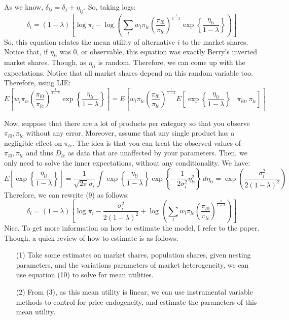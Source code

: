 \documentclass[12pt]{article}
\begin{document}
As we know, $\delta_{lj} = \delta_{j}+ \eta_{lj}$. So, taking logs:
\begin{equation}
\boxed{
    \delta_{i} = (1-\lambda) \left[\log \pi_i - \log \left(\sum_{l} w_l \pi_{lc} \left(\frac{\pi_{l0}}{\pi_{lc}}\right)^{\frac{1}{1-\lambda}} \exp\left\{\frac{\eta_{li}}{1-\lambda}\right\}\right)\right]}
\end{equation}
So, this equation relates the mean utility of alternative $i$ to the market shares. Notice that, if $\eta_{li}$ was 0, or observable, this equation was exactly Berry's inverted market shares. Though, as $\eta_{li}$ is random. Therefore, we can come up with the expectations. Notice that all market shares depend on this random variable too. Therefore, using LIE:
\begin{equation*}
    E\left[w_l \pi_{lc} \left(\frac{\pi_{l0}}{\pi_{lc}}\right)^{\frac{1}{1-\lambda}} \exp\left\{\frac{\eta_{li}}{1-\lambda}\right\}\right] = E\left[w_l \pi_{lc} \left(\frac{\pi_{l0}}{\pi_{lc}}\right)^{\frac{1}{1-\lambda}} E\left[\exp\left\{\frac{\eta_{li}}{1-\lambda}\right\} \mid \pi_{l0},\pi_{lc}\right]\right]
\end{equation*}

Now, suppose that there are a lot of products per category
so that you observe $\pi_{l0},\pi_{lc}$ without any error. Moreover, assume that any single product has a negligible effect on $\pi_{lc}$. The idea is that you can treat the observed values of $\pi_{l0},\pi_{lc}$ and thus $D_{lc}$ as data that are unaffected by your parameters. Then, we only need to solve the inner expectations, without any conditionality. We have:
\begin{equation*}
    E\left[\exp\left\{\frac{\eta_{li}}{1-\lambda}\right\} \right] = \frac{1}{\sqrt{2\pi} \sigma_i}\int \exp\left\{\frac{\eta_{li}}{1-\lambda}\right\} \exp\left\{-\frac{1}{2\sigma_i^2}\eta_{li}^2\right\} \, d\eta_{li} = \exp\left(\frac{\sigma_i^2}{2 (1-\lambda)^2}\right)
\end{equation*}
Therefore, we can rewrite (9) as follows:
\begin{equation}
\boxed{
    \delta_{i} = (1-\lambda) \left[\log \pi_i - \frac{\sigma_i^2}{2 (1-\lambda)^2} + \log \left(\sum_{l} w_l \pi_{lc} \left(\frac{\pi_{l0}}{\pi_{lc}}\right)^{\frac{1}{1-\lambda}}\right)\right]}
\end{equation}
Nice. To get more information on how to estimate the model, I refer to the paper. Though, a quick review of how to estimate is as follows:
\begin{itemize}
    \item [(1)] Take some estimates on market shares, population shares, given nesting parameters, and the variations parameters of market heterogeneity, we can use equation (10) to solve for mean utilities.
    \item[(2)] From (3), as this mean utility is linear, we can use instrumental variable methods to control for price endogeneity, and estimate the parameters of this mean utility.
\end{itemize}
\end{document}
